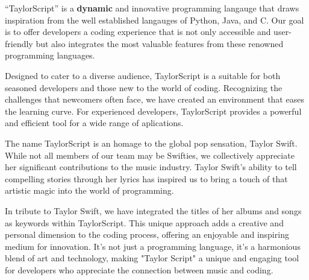 ``TaylorScript'' is a \textbf{dynamic} and innovative programming langauge that draws inspiration from the well established langauges of Python, Java, and C. Our goal is to offer developers a coding experience that is not only accessible and user-friendly but also integrates the most valuable features from these renowned programming languages.

Designed to cater to a diverse audience, TaylorScript is a suitable for both seasoned developers and those new to the world of coding. Recognizing the challenges that newcomers often face, we have created an environment that eases the learning curve. For experienced developers, TaylorScript provides a powerful and efficient tool for a wide range of aplications.

The name TaylorScript is an homage to the global pop sensation, Taylor Swift. While not all members of our team may be Swifties, we collectively appreciate her significant contributions to the music industry. Taylor Swift's ability to tell compelling stories through her lyrics has inspired us to bring a touch of that artistic magic into the world of programming.

In tribute to Taylor Swift, we have integrated the titles of her albums and songs as keywords within TaylorScript. This unique approach adds a creative and personal dimension to the coding process, offering an enjoyable and inspiring medium for innovation. It's not just a programming language, it's a harmonious blend of art and technology, making "Taylor Script" a unique and engaging tool for developers who appreciate the connection between music and coding.
